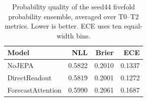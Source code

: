 \begin{table}[t]
\centering
\small
\caption{Probability quality of the seed44 fivefold probability ensemble, averaged over T0--T2 metrics. Lower is better. ECE uses ten equal-width bins.}
\label{tab:calibration}
\begin{tabular}{lrrr}
\toprule
Model & NLL & Brier & ECE \\
\midrule
NoJEPA & 0.5822 & 0.2010 & 0.1337 \\
DirectReadout & 0.5819 & 0.2001 & 0.1272 \\
ForecastAttention & 0.5990 & 0.2061 & 0.1687 \\
\bottomrule
\end{tabular}
\end{table}
